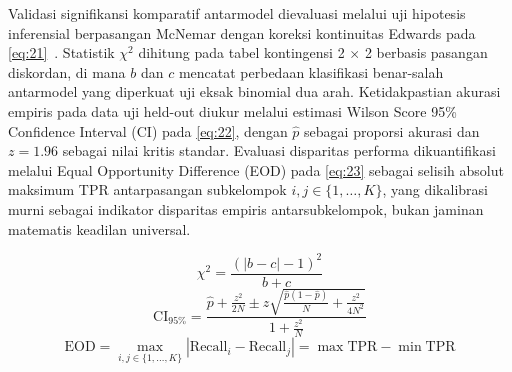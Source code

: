 Validasi signifikansi komparatif antarmodel dievaluasi melalui uji hipotesis inferensial berpasangan McNemar dengan koreksi kontinuitas Edwards pada \eqref{eq:21}~\cite{ref44}. Statistik $\chi^2$ dihitung pada tabel kontingensi 2 $\times$ 2 berbasis pasangan diskordan, di mana $b$ dan $c$ mencatat perbedaan klasifikasi benar-salah antarmodel yang diperkuat uji eksak binomial dua arah. Ketidakpastian akurasi empiris pada data uji held-out diukur melalui estimasi Wilson Score 95\% Confidence Interval (CI) pada \eqref{eq:22}, dengan $\hat{p}$ sebagai proporsi akurasi dan $z = 1.96$ sebagai nilai kritis standar. Evaluasi disparitas performa dikuantifikasi melalui Equal Opportunity Difference (EOD) pada \eqref{eq:23} sebagai selisih absolut maksimum TPR antarpasangan subkelompok $i, j \in \{1, \dots, K\}$, yang dikalibrasi murni sebagai indikator disparitas empiris antarsubkelompok, bukan jaminan matematis keadilan universal.

\begin{equation}
\chi^2 = \frac{(|b - c| - 1)^2}{b + c}
\label{eq:21}
\end{equation}
\begin{equation}
\text{CI}_{95\%} = \frac{\hat{p} + \frac{z^2}{2N} \pm z \sqrt{\frac{\hat{p}(1-\hat{p})}{N} + \frac{z^2}{4N^2}}}{1 + \frac{z^2}{N}}
\label{eq:22}
\end{equation}
\begin{equation}
\text{EOD} = \max_{i, j \in \{1, \dots, K\}} |\text{Recall}_i - \text{Recall}_j| = \max \text{TPR} - \min \text{TPR}
\label{eq:23}
\end{equation}
